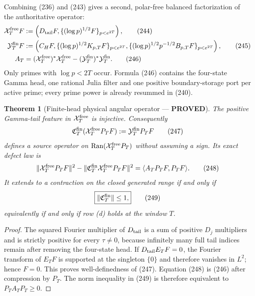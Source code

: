 \documentclass[11pt]{article}
\newtheorem{theorem}{Theorem}
\newcommand{\PROVED}{\textcolor{green!45!black}{\textbf{PROVED}}}
\newcommand{\Ran}{\operatorname{Ran}}
\begin{document}
Combining (236) and (243) gives a second, polar-free balanced factorization
of the authoritative operator:
\begin{align}
 \mathcal X_T^{\rm free}F
 &:=\left(D_{\rm tail}F,
          \{(\log p)^{1/2}F\}_{p<e^{2T}}\right),      \tag{244}\\
 \mathcal Y_T^{\rm fin}F
 &:=\left(C_HF,
   \{(\log p)^{1/2}K_{p,T}F\}_{p<e^{2T}},
   \{(\log p)^{1/2}p^{-1/2}B_{p,T}F\}_{p<e^{2T}}
          \right),                                   \tag{245}\\
 A_T&=(\mathcal X_T^{\rm free})^*\mathcal X_T^{\rm free}
     -(\mathcal Y_T^{\rm fin})^*\mathcal Y_T^{\rm fin}. \tag{246}
\end{align}
Only primes with $\log p<2T$ occur.  Formula (246) contains the four-state
Gamma head, one rational Julia filter and one positive boundary-storage port
per active prime; every prime power is already resummed in (240).

\begin{theorem}[Finite-head physical angular operator --- \PROVED]
The positive Gamma-tail feature in $\mathcal X_T^{\rm free}$ is injective.
Consequently
\begin{equation}
 \mathfrak C_T^{\rm fin}
   (\mathcal X_T^{\rm free}P_TF)
 :=\mathcal Y_T^{\rm fin}P_TF                         \tag{247}
\end{equation}
defines a source operator on
$\Ran(\mathcal X_T^{\rm free}P_T)$ without assuming a sign.  Its exact
defect law is
\begin{equation}
 \|\mathcal X_T^{\rm free}P_TF\|^2
 -\|\mathfrak C_T^{\rm fin}\mathcal X_T^{\rm free}P_TF\|^2
 =\langle A_TP_TF,P_TF\rangle.                       \tag{248}
\end{equation}
It extends to a contraction on the closed generated range if and only if
\begin{equation}
 \boxed{\|\mathfrak C_T^{\rm fin}\|\le1,}             \tag{249}
\end{equation}
equivalently if and only if row (d) holds at the window $T$.
\end{theorem}

\begin{proof}
The squared Fourier multiplier of $D_{\rm tail}$ is a sum of positive
$D_j$ multipliers and is strictly positive for every $\tau\ne0$, because
infinitely many full tail indices remain after removing the four-state head.
If $D_{\rm tail}E_TF=0$, the Fourier transform of $E_TF$ is supported at the
singleton $\{0\}$ and therefore vanishes in $L^2$; hence $F=0$.  This proves
well-definedness of (247).  Equation (248) is (246) after compression by
$P_T$.  The norm inequality in (249) is therefore equivalent to
$P_TA_TP_T\ge0$.
\end{proof}
\end{document}
